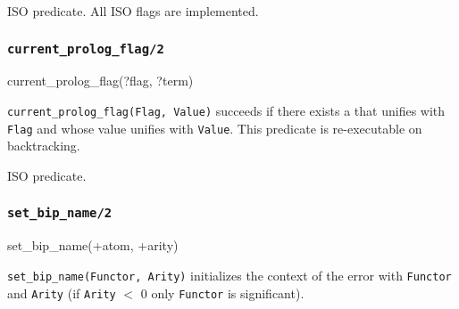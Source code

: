 \Portability

ISO predicate. All ISO flags are implemented.

\subsubsection{\texttt{current\_prolog\_flag/2}}
\label{current-prolog-flag/2}

\begin{TemplatesOneCol}
current\_prolog\_flag(?flag, ?term)

\end{TemplatesOneCol}

\Description

\texttt{current\_prolog\_flag(Flag, Value)}
succeeds if there exists a  that unifies with
\texttt{Flag} and whose value unifies with \texttt{Value}. This predicate
is re-executable on backtracking.

\begin{PlErrors}



\end{PlErrors}

\Portability

ISO predicate.

\subsubsection{\texttt{set\_bip\_name/2}}
\label{set-bip-name/2}

\begin{TemplatesOneCol}
set\_bip\_name(+atom, +arity)

\end{TemplatesOneCol}

\Description

\texttt{set\_bip\_name(Functor, Arity)} initializes the context of the error
 with \texttt{Functor} and
\texttt{Arity} (if \texttt{Arity} $<$ 0 only \texttt{Functor} is
significant).

\begin{PlErrors}





\end{PlErrors}

